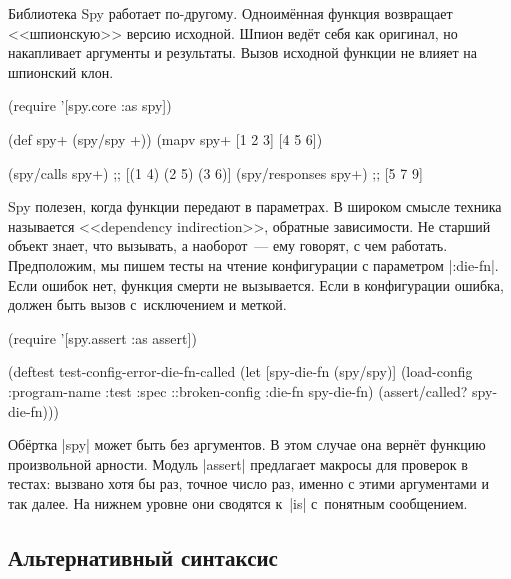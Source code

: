
Библиотека Spy работает
по-другому. Одноим\"{е}нная функция возвращает <<шпионскую>> версию исходной. Шпион
вед\"{е}т себя как оригинал, но накапливает аргументы и результаты. Вызов
исходной функции не влияет на шпионский клон.

\begin{english}
  \begin{clojure}
(require '[spy.core :as spy])

(def spy+ (spy/spy +))
(mapv spy+ [1 2 3] [4 5 6])

(spy/calls spy+)
;; [(1 4) (2 5) (3 6)]
(spy/responses spy+)
;; [5 7 9]
  \end{clojure}
\end{english}



Spy полезен, когда функции передают в параметрах. В широком смысле техника
называется <<dependency indirection>>, обратные зависимости. Не старший объект
знает, что вызывать, а наоборот~--- ему говорят, с чем работать. Предположим, мы
пишем тесты на чтение конфигурации с параметром \spverb|:die-fn|. Если ошибок
нет, функция смерти не вызывается. Если в конфигурации ошибка, должен быть вызов
с~исключением и меткой.

\begin{english}
  \begin{clojure}
(require '[spy.assert :as assert])

(deftest test-config-error-die-fn-called
  (let [spy-die-fn (spy/spy)]
    (load-config {:program-name :test
                  :spec ::broken-config
                  :die-fn spy-die-fn})
    (assert/called? spy-die-fn)))
  \end{clojure}
\end{english}

Об\"{е}ртка \spverb|spy| может быть без аргументов. В этом случае она верн\"{е}т
функцию произвольной арности. Модуль \spverb|assert| предлагает макросы для
проверок в тестах: вызвано хотя бы раз, точное число раз, именно с этими
аргументами и так далее. На нижнем уровне они сводятся к~\spverb|is| с~понятным
сообщением.

\subsection{Альтернативный синтаксис}

